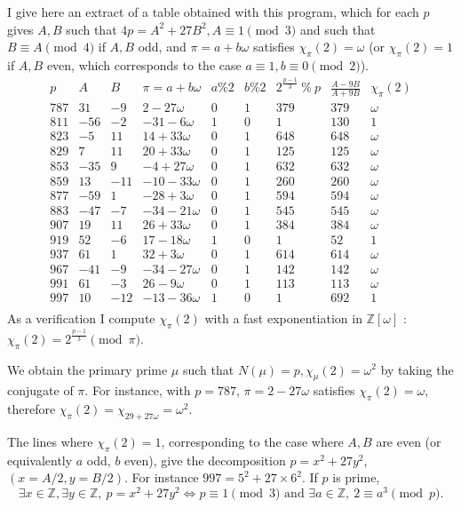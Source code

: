 \documentclass[11pt,a4paper]{article}
\newcommand{\Z}{\mathbb{Z}}
\begin{document}
I give here an extract of a table obtained with this program, which for each $p$ gives $A,B$ such that $4p = A^2 + 27 B^2, A \equiv 1 \pmod 3$ and such that $B \equiv A \pmod 4$ if $A,B$ odd, and $\pi =a +b \omega$ satisfies $\chi_\pi(2) = \omega$ (or $\chi_\pi(2) = 1$ if $A,B$ even, which corresponds to the case $a\equiv 1, b \equiv 0 \pmod 2$).
$$
\begin{array}{l|l|l|l|l|l|l|l|l}
p    &  A   & B  & \pi = a + b \omega   & a \text{\%} 2 & b \% 2 & 2^\frac{p-1}{3}\ \% \ p & \frac{A-9B}{A+9B} & \chi_\pi(2)\\
\hline
787 & 31 & -9 & 2  -27\omega & 0 & 1 & 379 & 379 &\omega \\
811 & -56 & -2 & -31  -6 \omega & 1 & 0 & 1 & 130 & 1 \\
823 & -5 & 11 & 14 + 33\omega & 0 & 1 & 648 & 648 & \omega \\
829 & 7 & 11 & 20 + 33\omega & 0 & 1 & 125 & 125 & \omega  \\
853 & -35 & 9 & -4 + 27\omega & 0 & 1 & 632 & 632 & \omega \\
859 & 13 & -11 & -10  -33\omega & 0 & 1 & 260 & 260 & \omega \\
877 & -59 & 1 & -28 + 3 \omega& 0 & 1 & 594 & 594 & \omega  \\
883 & -47 & -7 & -34  -21\omega & 0 & 1 & 545 & 545 & \omega \\
907 & 19 & 11 & 26 + 33\omega & 0 & 1 & 384 & 384 & \omega  \\
919 & 52 & -6 & 17  -18\omega & 1 & 0 & 1 & 52 & 1 \\
937 & 61 & 1 & 32 + 3\omega & 0 & 1 & 614 & 614 & \omega \\
967 & -41 & -9 & -34  -27\omega & 0 & 1 & 142 & 142 & \omega  \\
991 & 61 & -3 & 26  -9\omega & 0 & 1 & 113 & 113 & \omega  \\
997 & 10 & -12 & -13  -36\omega & 1 & 0 & 1 & 692 & 1 \\
\end{array}
$$
As a verification I compute $\chi_\pi(2)$ with a fast exponentiation in $\Z[\omega]$ : $\chi_\pi(2) = 2^\frac{p-1}{3} \pmod \pi$.

We obtain the primary prime $\mu$ such that $N(\mu) = p, \chi_\mu(2) = \omega^2$ by taking the conjugate of $\pi$. For instance, with $p = 787$,  $\pi =2 - 27\omega$ satisfies $\chi_\pi(2) = \omega$, therefore $\chi_{\overline{\pi}}(2) = \chi_{29 + 27\omega} = \omega^2$.


The lines where $\chi_\pi(2) = 1$, corresponding to the case where $A,B$ are even (or equivalently $a$ odd, $b$ even), give the decomposition ${p = x^2 + 27 y^2}$, ${(x = A/2,y = B/2)}$. For instance $997 = 5^2 + 27\times 6^2$. If $p$ is prime,
$$\exists x\in \Z, \exists y \in \Z,\  p = x^2 + 27y^2 \iff p\equiv 1 \pmod 3 \text{ and } \exists a \in \Z,\ 2 \equiv a^3 \pmod p.$$
\end{document}
